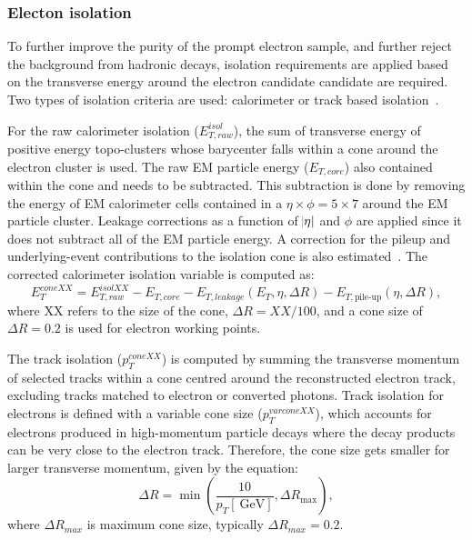 \subsubsection{Electon isolation}
To further improve the purity of the prompt electron sample, and further reject the background from hadronic decays, isolation requirements are applied based on the transverse energy around the electron candidate candidate are required. Two types of isolation criteria are used: calorimeter or track based isolation~\cite{Aad:2019tso}. 

For the raw calorimeter isolation ($E_{T,raw}^{isol}$), the sum of transverse energy of positive energy topo-clusters whose barycenter falls within a cone around the electron cluster is used. The raw EM particle energy ($E_{T,core}$) also contained within the cone and needs to be subtracted. This subtraction is done by removing the energy of EM calorimeter cells contained in a $\eta \times \phi = 5 \times 7$ around the EM particle cluster. Leakage corrections as a function of $\abs{\eta}$ and $\phi$ are applied since it does not subtract all of the EM particle energy. A correction for the pileup and underlying-event contributions to the isolation cone is also estimated~\cite{Cacciari:2007fd}. The corrected calorimeter isolation variable is computed as:
\begin{equation}
    E_{T}^{coneXX} = E_{T,raw}^{isolXX} - E_{T,core} - E_{T,leakage}(E_T,\eta,\Delta R) - E_{{T,\textrm{pile-up}}}(\eta,\Delta R),
\end{equation}
where XX refers to the size of the cone, $\Delta R = XX/100$, and a cone size of $\Delta R = 0.2$ is used for electron working points.  

The track isolation ($p_{T}^{coneXX}$) is computed by summing the transverse momentum of selected tracks within a cone centred around the reconstructed electron track, excluding tracks matched to electron or converted photons. Track isolation for electrons is defined with a variable cone size ($p_{T}^{varconeXX}$), which accounts for electrons produced in high-momentum particle decays where the decay products can be very close to the electron track. Therefore, the cone size gets smaller for larger transverse momentum, given by the equation: 
\begin{equation}
    \Delta R = \min \left( \frac{10}{p_T[\SI{}{\giga\electronvolt}]}, \Delta R_{\mathrm{max}}\right),
\end{equation}
where $\Delta R_{max}$ is maximum cone size, typically $\Delta R_{max} = 0.2$. 

